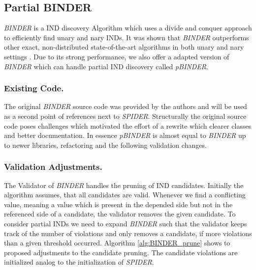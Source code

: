 \subsection{Partial BINDER}
\textit{BINDER} is a IND discovery Algorithm which uses a divide and conquer approach to efficiently find unary and nary INDs\cite{papenbrock2015divide}. It was shown that \textit{BINDER} outperforms other exact, non-distributed state-of-the-art algorithms in both unary and nary settings \cite{dursch2019inclusion}. Due to its strong performance, we also offer a adapted version of \textit{BINDER} which can handle partial IND discovery called \textit{pBINDER}.

\subsubsection{\textbf{Existing Code.}}
The original \textit{BINDER} source code was provided by the authors and will be used as a second point of references next to \textit{SPIDER}. Structurally the original source code poses challenges which motivated the effort of a rewrite which clearer classes and better documentation. In essence \textit{pBINDER} is almost equal to \textit{BINDER} up to newer libraries, refactoring and the following validation changes. 

\subsubsection{\textbf{Validation Adjustments.}}
The Validator of \textit{BINDER} handles the pruning of IND candidates. Initially the algorithm assumes, that all candidates are valid. Whenever we find a conflicting value, meaning a value which is present in the depended side but not in the referenced side of a candidate, the validator removes the given candidate. To consider partial INDs we need to expand \textit{BINDER} such that the validator keeps track of the number of violations and only removes a candidate, if more violations than a given threshold occurred. Algorithm \ref{alg:BINDER_prune} shows to proposed adjustments to the candidate pruning. The candidate violations are initialized analog to the initialization of \textit{SPIDER}.

